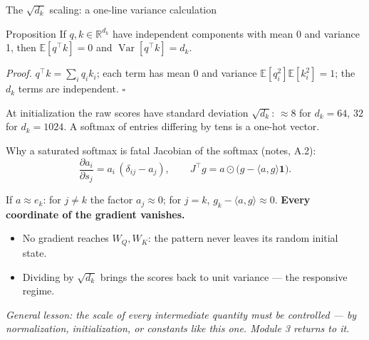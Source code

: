 \documentclass[11pt,aspectratio=169]{beamer}
\newcommand{\R}{\mathbb{R}}
\newcommand{\E}{\mathbb{E}}
\newcommand{\T}{^{\top}}
\newcommand{\dest}[1]{\textcolor{structure}{\textbf{#1}}}
\newcommand{\hook}[1]{{\small\textcolor{gray!60!black}{\textit{#1}}}}
\begin{document}
\begin{frame}{The $\sqrt{d_k}$ scaling: a one-line variance calculation}
  \begin{block}{Proposition}
    If $q,k\in\R^{d_k}$ have independent components with mean 0 and variance 1, then
    $\E[q\T k] = 0$ and $\operatorname{Var}[q\T k] = d_k$.
  \end{block}

  \vspace{0.5em}
  \emph{Proof.} $q\T k = \sum_i q_ik_i$; each term has mean 0 and variance
  $\E[q_i^2]\E[k_i^2] = 1$; the $d_k$ terms are independent. $\square$

  \vspace{0.8em}
  At initialization the raw scores have standard deviation $\sqrt{d_k}$: $\approx 8$ for
  $d_k = 64$, $32$ for $d_k = 1024$. A softmax of entries differing by tens is a one-hot
  vector.
\end{frame}

\begin{frame}{Why a saturated softmax is fatal}
  Jacobian of the softmax (notes, A.2):
  \[
    \frac{\partial a_i}{\partial s_j} = a_i\,(\delta_{ij} - a_j),\qquad
    J\T g = a\odot\big(g - \langle a,g\rangle\mathbf{1}\big).
  \]

  \vspace{0.6em}
  If $a\approx e_k$: for $j\neq k$ the factor $a_j\approx 0$; for $j = k$,
  $g_k - \langle a,g\rangle\approx 0$. \dest{Every coordinate of the gradient vanishes.}

  \vspace{0.8em}
  \begin{itemize}
    \item No gradient reaches $W_Q, W_K$: the pattern never leaves its random initial state.
    \item Dividing by $\sqrt{d_k}$ brings the scores back to unit variance --- the
          responsive regime.
  \end{itemize}

  \vspace{0.5em}
  \hook{General lesson: the scale of every intermediate quantity must be controlled ---
  by normalization, initialization, or constants like this one. Module 3 returns to it.}
\end{frame}
\end{document}
